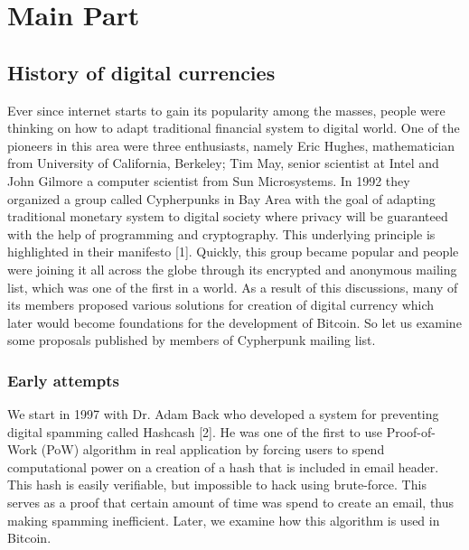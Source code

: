 \documentclass[conference,compsoc]{IEEEtran}
\begin{document}


\section{Main Part}

\subsection{History of digital currencies}
Ever since internet starts to gain its popularity among the masses, people were thinking on how to adapt traditional financial system to digital world. 
One of the pioneers in this area were three enthusiasts, namely Eric Hughes, mathematician from University of California, Berkeley; Tim May, senior scientist at Intel and John Gilmore a computer scientist from Sun Microsystems. 
In 1992 they organized a group called Cypherpunks in Bay Area with the goal of adapting traditional monetary system to digital society where privacy will be guaranteed with the help of programming and cryptography. 
This underlying principle is highlighted in their manifesto [1].
Quickly, this group became popular and people were joining it all across the globe through its encrypted and anonymous mailing list, which was one of the first in a world. 
As a result of this discussions, many of its members proposed various solutions for creation of digital currency which later would become foundations for the development of Bitcoin. 
So let us examine some proposals published by members of Cypherpunk mailing list.

\subsubsection{Early attempts}
We start in 1997 with Dr. Adam Back who developed a system for preventing digital spamming called Hashcash [2]. 
He was one of the first to use Proof-of-Work (PoW) algorithm in real application by forcing users to spend computational power on a creation of a hash that is included in email header. 
This hash is easily verifiable, but impossible to hack using brute-force. 
This serves as a proof that certain amount of time was spend to create an email, thus making spamming inefficient. 
Later, we examine how this algorithm is used in Bitcoin. 
\end{document}
